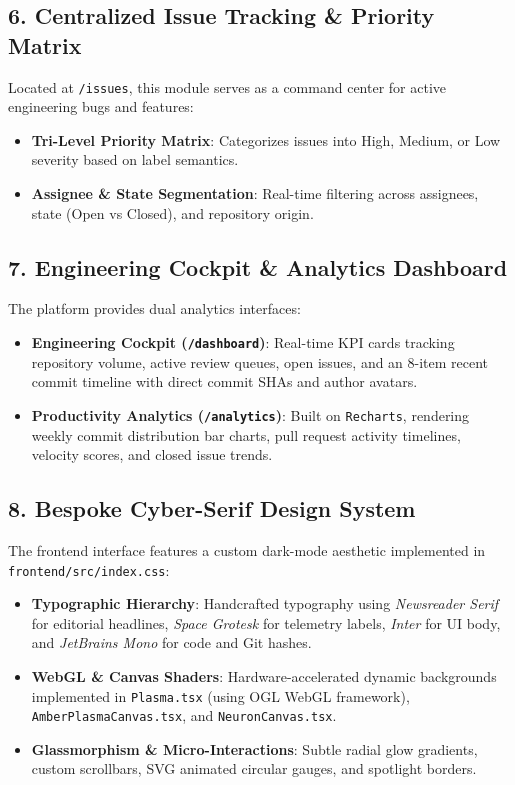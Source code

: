 \documentclass[11pt,a4paper]{article}
\begin{document}
\subsection{6. Centralized Issue Tracking \& Priority Matrix}
Located at \texttt{/issues}, this module serves as a command center for active engineering bugs and features:
\begin{itemize}[leftmargin=1.5em]
    \item \textbf{Tri-Level Priority Matrix}: Categorizes issues into High, Medium, or Low severity based on label semantics.
    \item \textbf{Assignee \& State Segmentation}: Real-time filtering across assignees, state (Open vs Closed), and repository origin.
\end{itemize}

\subsection{7. Engineering Cockpit \& Analytics Dashboard}
The platform provides dual analytics interfaces:
\begin{itemize}[leftmargin=1.5em]
    \item \textbf{Engineering Cockpit (\texttt{/dashboard})}: Real-time KPI cards tracking repository volume, active review queues, open issues, and an 8-item recent commit timeline with direct commit SHAs and author avatars.
    \item \textbf{Productivity Analytics (\texttt{/analytics})}: Built on \texttt{Recharts}, rendering weekly commit distribution bar charts, pull request activity timelines, velocity scores, and closed issue trends.
\end{itemize}

\subsection{8. Bespoke Cyber-Serif Design System}
The frontend interface features a custom dark-mode aesthetic implemented in \texttt{frontend/src/index.css}:
\begin{itemize}[leftmargin=1.5em]
    \item \textbf{Typographic Hierarchy}: Handcrafted typography using \textit{Newsreader Serif} for editorial headlines, \textit{Space Grotesk} for telemetry labels, \textit{Inter} for UI body, and \textit{JetBrains Mono} for code and Git hashes.
    \item \textbf{WebGL \& Canvas Shaders}: Hardware-accelerated dynamic backgrounds implemented in \texttt{Plasma.tsx} (using OGL WebGL framework), \texttt{AmberPlasmaCanvas.tsx}, and \texttt{NeuronCanvas.tsx}.
    \item \textbf{Glassmorphism \& Micro-Interactions}: Subtle radial glow gradients, custom scrollbars, SVG animated circular gauges, and spotlight borders.
\end{itemize}
\end{document}
